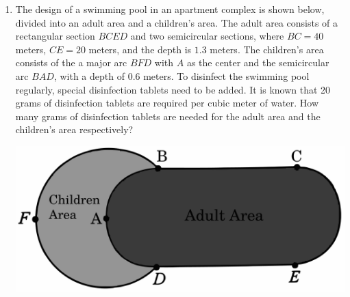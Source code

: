 \documentclass{report}
\begin{document}
\begin{enumerate}
    \item The design of a swimming pool in an apartment complex is shown below, divided into an adult area and a children's area. The adult area consists of a rectangular section $BCED$ and two semicircular sections, where $BC = 40$ meters, $CE = 20$ meters, and the depth is $1.3$ meters. The children's area consists of the a major arc $BFD$ with $A$ as the center and the semicircular arc $BAD$, with a depth of $0.6$ meters. To disinfect the swimming pool regularly, special disinfection tablets need to be added. It is known that 20 grams of disinfection tablets are required per cubic meter of water. How many grams of disinfection tablets are needed for the adult area and the children's area respectively?
    \begin{center}
        \includegraphics[scale=0.15]{assets/8-36.png}
    \end{center}

\end{enumerate}
\end{document}
